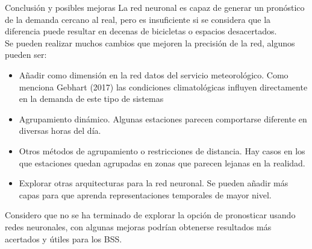 \documentclass[12pt,spanish]{article}
\makeatletter
\newcounter{numberofruns}%
\newcommand{\secfig@@writecounterstage}{1}%
\newcommand{\secfig@@readcounterstage}{2}%
\newcommand{\secfig@@writecontentstage}{2}%
\newlength{\loftsectionbeforeskipamount}%
\newlength{\loftsectionafterskipamount}%
\newcommand{\loftsectionbeforeskip}{\vspace{\loftsectionbeforeskipamount}}%
\newcommand{\loftsectionafterskip}{\vspace{\loftsectionafterskipamount}}%
\newcounter{totalsections}
\let\LaTeXStandardSection\section%
\newcommand{\unstarredsection@@noopt}[1]{%
	\unstarredsection@@opt[#1]{#1}%
}%
\newcommand{\StoreCounterValue}[1]{%
	\immediate\expandafter\write\csname #1countsout\endcsname{%
		\number\value{#1}%
	}%
}%
\newcommand{\LoadAllStoredCounterValues}[1]{%
	\ifnumequal{\number\value{#1}}{\secfig@@readcounterstage}{%
		\read\figurecountsin to \lastsectionfigures
		\read\tablecountsin  to \lastsectiontables%
	}{}%
}%
\newcommand{\loftsectioncontentsline}[1]{%
	\loftsectionbeforeskip\textbf{\large\thesection~#1}\loftsectionafterskip
}%
\newcommand{\unstarredsection@@opt}[2][]{%
	\iftoggle{SectionsInLOFT}{%
		\FloatBarrier%
		\gdef\lastsectionfigures{0}%
		\gdef\lastsectiontables{0}%
		\ifnumequal{\number\value{numberofruns}}{\secfig@@writecounterstage}{%
			\gdef\lastsectionfigures{\number\value{figure}}%
			\gdef\lastsectionfigures{\number\value{table}}%
			\ifnumequal{\number\value{totalsections}}{0}{%
			}{%
				\StoreCounterValue{figure}%
				\StoreCounterValue{table}%
			}%
		}{%
			\LoadAllStoredCounterValues{numberofruns}%
		}%
	}{%
	}%
	\LaTeXStandardSection[#1]{#2}%
	\iftoggle{SectionsInLOFT}{%
		\ifnumequal{\number\value{numberofruns}}{\secfig@@writecontentstage}{%
			\ifnumgreater{\lastsectionfigures}{0}{%
				\typeout{Writing a section entry for \thesection{}to the LOF}%
				\iftoggle{AppendixSectionsInLOF}{%
					\addtocontents{lof}{\loftsectioncontentsline{#1}}%
				}{}%
			}{%
				\typeout{No figures in \thesection!}
			}%
			\ifnumgreater{\lastsectiontables}{0}{%
				\typeout{Writing a section entry for \thesection{}to the LOT}%
				\iftoggle{AppendixSectionsInLOT}{%
					\addtocontents{lot}{\loftsectioncontentsline{#1}}%
				}{}%
			}{%
				\typeout{No tables in \thesection!}
			}%
		}{}%
	}{%
	}%
}%
\newcommand{\unstarredsection}{%
	\@ifnextchar[{%
		\unstarredsection@@opt%
	}{%
		\unstarredsection@@noopt%
	}%
}%
\newcommand{\starredsection}[1]{%
	\LaTeXStandardSection*{#1}%
}%
\renewcommand{\section}{%
	\@ifstar{%
		\starredsection%
	}{%
		\unstarredsection%
	}%
}%
\makeatother
\begin{document}
	\section{Conclusión y posibles mejoras}
	La red neuronal es capaz de generar un pronóstico de la demanda cercano al real, pero es insuficiente si se considera que la diferencia puede resultar en decenas de bicicletas o espacios desacertados.\\
	Se pueden realizar muchos cambios que mejoren la precisión de la red, algunos pueden ser:
	\begin{itemize}
		\item Añadir como dimensión en la red datos del servicio meteorológico. Como menciona Gebhart (2017) las condiciones climatológicas influyen directamente en la demanda de este tipo de sistemas
		\item Agrupamiento dinámico. Algunas estaciones parecen comportarse diferente en diversas horas del día.
		\item Otros métodos de agrupamiento o restricciones de distancia. Hay casos en los que estaciones quedan agrupadas en zonas que parecen lejanas en la realidad.
		\item Explorar otras arquitecturas para la red neuronal. Se pueden añadir más capas para que aprenda representaciones temporales de mayor nivel.
	\end{itemize}
	Considero que no se ha terminado de explorar la opción de pronosticar usando redes neuronales, con algunas mejoras podrían obtenerse resultados más acertados y útiles para los BSS.
	\newpage
\end{document}

